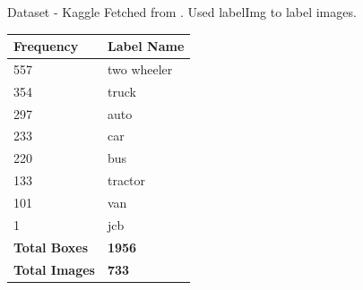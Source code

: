 \documentclass{beamer}
\newcommand{\link}[2]{\href{#1}{\textit{\color{blue}{#2}}}}%
\begin{document}
	\begin{frame}[allowframebreaks]{Dataset - Kaggle}
		Fetched from \link{https://www.kaggle.com/datasets/dataclusterlabs/indian-vehicle-dataset}{Kaggle}. Used labelImg to label images. 
		\begin{table}[]
			\centering
			\begin{tabular}{|l|l|}
				\hline
				\textbf{Frequency}    & \textbf{Label Name} \\ \hline
				557                   & two wheeler         \\ \hline
				354                   & truck               \\ \hline
				297                   & auto                \\ \hline
				233                   & car                 \\ \hline
				220                   & bus                 \\ \hline
				133                   & tractor             \\ \hline
				101                   & van                 \\ \hline
				1                     & jcb                 \\ \hline
				\textbf{Total Boxes}  & \textbf{1956}       \\ \hline
				\textbf{Total Images} & \textbf{733}        \\ \hline
			\end{tabular}
		\end{table}
		
		
		

\end{frame}
\end{document}
